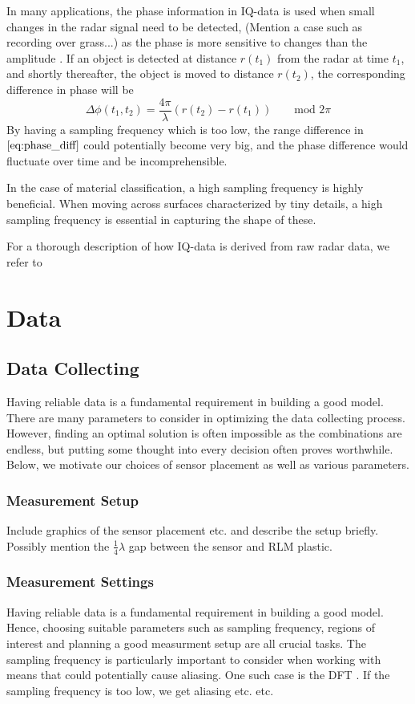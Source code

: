 In many applications, the phase information in IQ-data is used when small changes in the radar signal need to be detected, (Mention a case such as recording over grass...) as the phase is more sensitive to changes than the amplitude \citep{lien_gillian_karagozler_amihood_schwesig_olson_raja_poupyrev_2016}. If an object is detected at distance $r(t_1)$ from the radar at time $t_1$, and shortly thereafter, the object is moved to distance $r(t_2)$, the corresponding difference in phase will be
\begin{equation}
	\label{eq:phase_diff}
	\Delta\phi(t_1, t_2)=\frac{4\pi}{\lambda}(r(t_2)-r(t_1)) \quad\quad \textrm{mod 2$\pi$}
\end{equation}
By having a sampling frequency which is too low, the range difference in $\eqref{eq:phase_diff}$ could potentially become very big, and the phase difference would fluctuate over time and be incomprehensible.

In the case of material classification, a high sampling frequency is highly beneficial. When moving across surfaces characterized by tiny details, a high sampling frequency is essential in capturing the shape of these.

For a thorough description of how IQ-data is derived from raw radar data, we refer to \citep{richards_2014}

\section{Data}
\subsection{Data Collecting}
Having reliable data is a fundamental requirement in building a good model. There are many parameters to consider in optimizing the data collecting process. However,  finding an optimal solution is often impossible as the combinations are endless, but putting some thought into every decision often proves worthwhile. Below, we motivate our choices of sensor placement as well as various parameters.

\subsubsection{Measurement Setup}


Include graphics of the sensor placement etc. and describe the setup briefly. Possibly mention the $\frac14\lambda$ gap between the sensor and RLM plastic.
\subsubsection{Measurement Settings}
Having reliable data is a fundamental requirement in building a good model. Hence, choosing suitable parameters such as sampling frequency, regions of interest and planning a good measurment setup are all crucial tasks. The sampling frequency is particularly important to consider when working with means that could potentially cause aliasing. One such case is the DFT \citep{lindgren_rootzeŽn_sandsten_2013}. If the sampling frequency is too low, we get aliasing etc. etc. 

